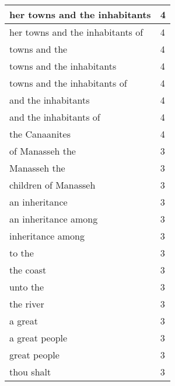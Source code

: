 \begin{center}
\begin{longtable}{|p{3.0in}|p{0.5in}|}
her towns and the inhabitants & 4\\ \hline 
her towns and the inhabitants of & 4\\ \hline 
towns and the & 4\\ \hline 
towns and the inhabitants & 4\\ \hline 
towns and the inhabitants of & 4\\ \hline 
and the inhabitants & 4\\ \hline 
and the inhabitants of & 4\\ \hline 
the Canaanites & 4\\ \hline 
of Manasseh the & 3\\ \hline 
Manasseh the & 3\\ \hline 
children of Manasseh & 3\\ \hline 
an inheritance & 3\\ \hline 
an inheritance among & 3\\ \hline 
inheritance among & 3\\ \hline 
to the & 3\\ \hline 
the coast & 3\\ \hline 
unto the & 3\\ \hline 
the river & 3\\ \hline 
a great & 3\\ \hline 
a great people & 3\\ \hline 
great people & 3\\ \hline 
thou shalt & 3\\ \hline 
\end{longtable}
\end{center}





